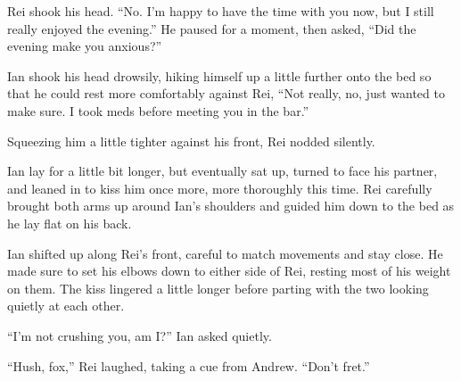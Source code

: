 Rei shook his head. ``No. I'm happy to have the time with you now, but I still really enjoyed the evening.'' He paused for a moment, then asked, ``Did the evening make you anxious?''

Ian shook his head drowsily, hiking himself up a little further onto the bed so that he could rest more comfortably against Rei, ``Not really, no, just wanted to make sure. I took meds before meeting you in the bar.''

Squeezing him a little tighter against his front, Rei nodded silently.

Ian lay for a little bit longer, but eventually sat up, turned to face his partner, and leaned in to kiss him once more, more thoroughly this time. Rei carefully brought both arms up around Ian's shoulders and guided him down to the bed as he lay flat on his back.

Ian shifted up along Rei's front, careful to match movements and stay close. He made sure to set his elbows down to either side of Rei, resting most of his weight on them. The kiss lingered a little longer before parting with the two looking quietly at each other.

``I'm not crushing you, am I?'' Ian asked quietly.

``Hush, fox,'' Rei laughed, taking a cue from Andrew. ``Don't fret.''
